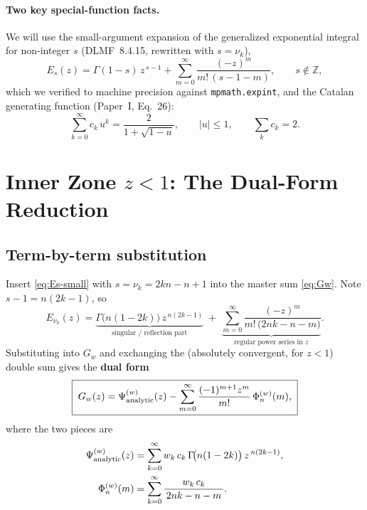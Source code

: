 \documentclass{article}
\begin{document}
\paragraph{Two key special-function facts.}
We will use the small-argument expansion of the generalized exponential integral
for non-integer $s$ (DLMF~8.4.15, rewritten with $s=\nu_k$),
\begin{equation}\label{eq:Es-small}
E_{s}(z)=\Gamma(1-s)\,z^{\,s-1}
        +\sum_{m=0}^{\infty}\frac{(-z)^m}{m!\,(s-1-m)},
\qquad s\notin\mathbb{Z},
\end{equation}
which we verified to machine precision against \texttt{mpmath.expint}, and the
Catalan generating function (Paper~I, Eq.~26):
\begin{equation}\label{eq:catalan-gf}
\sum_{k=0}^{\infty}c_k\,u^k=\frac{2}{1+\sqrt{1-u}},
\qquad |u|\le1,
\qquad \sum_k c_k=2 .
\end{equation}

\section{Inner Zone \texorpdfstring{$z<1$}{z<1}: The Dual-Form Reduction}
\label{sec:inner}

\subsection{Term-by-term substitution}

Insert \eqref{eq:Es-small} with $s=\nu_k=2kn-n+1$ into the master sum
\eqref{eq:Gw}.  Note $s-1=n(2k-1)$, so
\begin{equation}\label{eq:Es-split}
E_{\nu_k}(z)
=\underbrace{\Gamma\!\bigl(n(1-2k)\bigr)\,z^{\,n(2k-1)}}_{\text{singular / reflection part}}
\;+\;\underbrace{\sum_{m=0}^{\infty}\frac{(-z)^m}{m!\,\bigl(2nk-n-m\bigr)}}_{\text{regular power series in }z}.
\end{equation}
Substituting into $G_w$ and exchanging the (absolutely convergent, for $z<1$)
double sum gives the \textbf{dual form}
\begin{equation}\label{eq:dualform}
\boxed{\;
G_w(z)=\Psi^{(w)}_{\rm analytic}(z)
      -\sum_{m=0}^{\infty}\frac{(-1)^{m+1}z^m}{m!}\,\Phi^{(w)}_n(m),
\;}
\end{equation}
where the two pieces are
\begin{align}
\Psi^{(w)}_{\rm analytic}(z)
   &= \sum_{k=0}^{\infty}w_k\,c_k\,\Gamma\!\bigl(n(1-2k)\bigr)\,z^{\,n(2k-1)},
   \label{eq:Psi}\\
\Phi^{(w)}_n(m)
   &= \sum_{k=0}^{\infty}\frac{w_k\,c_k}{\,2nk-n-m\,}.
   \label{eq:Phi}
\end{align}
\end{document}
